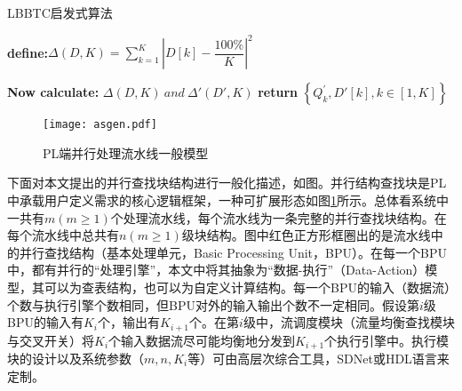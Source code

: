 \begin{algorithm}[!h]
	\caption{LBBTC启发式算法  \label{lbbtcms}}
	\IncMargin{2em}
	\DontPrintSemicolon
	
\textbf{define:}$\Delta(D,K) =\sum ^{K}_{k=1}\left| D\left[ k\right] -\dfrac {100\% }{K}\right| ^{2}$\;


\textbf{Now calculate:} $\Delta(D,K)\  and\  \Delta'(D',K) $\;
{
	\textbf{return} $\left\{ Q^{'}_{k},D'\left[ k\right] ,k\in \left[ 1,K\right] \right\} $\;
}
\end{algorithm}

\begin{figure}[!ht]
	\centering 
	\texttt{[image: asgen.pdf]}
	\caption{PL端并行处理流水线一般模型} \label{fig:asgen}
\end{figure}

下面对本文提出的并行查找块结构进行一般化描述，如图。并行结构查找块是PL中承载用户定义需求的核心逻辑框架，一种可扩展形态如图\ref{fig:asgen}所示。总体看系统中一共有$m(m\geq 1)$个处理流水线，每个流水线为一条完整的并行查找块结构。在每个流水线中总共有$ n(m \geq 1) $级块结构。图中红色正方形框圈出的是流水线中的并行查找结构（基本处理单元，Basic Processing Unit，BPU）。在每一个BPU中，都有并行的“处理引擎”，本文中将其抽象为“数据-执行”（Data-Action）模型，其可以为查表结构，也可以为自定义计算结构。每一个BPU的输入（数据流）个数与执行引擎个数相同，但BPU对外的输入输出个数不一定相同。假设第$i$级BPU的输入有$K_i$个，输出有$K_{i+1}$个。在第$i$级中，流调度模块（流量均衡查找模块与交叉开关）将$K_i$个输入数据流尽可能均衡地分发到$K_{i+1}$个执行引擎中。执行模块的设计以及系统参数（$m,n,K_i$等）可由高层次综合工具，SDNet或HDL语言来定制。




\label{spe4}











